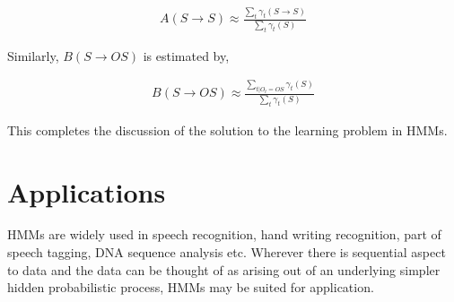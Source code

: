 \documentclass[11pt, a4paper]{article}
\begin{document}
\begin{align*}
	A(S \rightarrow S) \approx \frac{\sum_t \gamma_t(S \rightarrow S)}{\sum_t \gamma_t(S)} 
\end{align*} 

Similarly, $B(S \rightarrow OS)$ is estimated by,

\begin{align*}
	B(S \rightarrow OS) \approx \frac{\sum_{t|O_t = OS} \gamma_t(S)}{\sum_t \gamma_t(S)} 
\end{align*} 

This completes the discussion of the solution to the learning problem in HMMs.

\section{Applications}

HMMs are widely used in speech recognition, hand writing recognition, part of speech tagging, DNA sequence analysis etc. Wherever there is sequential aspect to data and the data can be thought of as arising out of an underlying simpler hidden probabilistic process, HMMs may be suited for application.  
\end{document}
